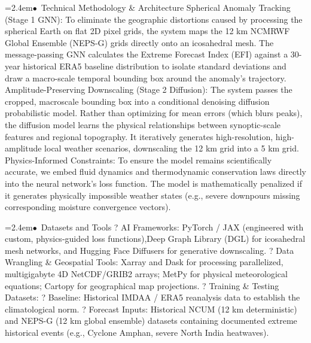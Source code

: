 \documentclass[10pt,a4paper]{article}
\begin{document}
\begin{tcolorbox}[pscard, title={"\textbf{SIH26078} \quad $\vert$ \quad AI-Driven Spatio-Temporal Tracking of Extreme Weather Anomalies in Medium-R...}]
\noindent\hspace*{1.2em}\hangindent=2.4em\textcolor{sihblue}{$\bullet$}~\small Technical Methodology \& Architecture Spherical Anomaly Tracking (Stage 1 GNN): To eliminate the geographic distortions caused by processing the spherical Earth on flat 2D pixel grids, the system maps the 12 km NCMRWF Global Ensemble (NEPS-G) grids directly onto an icosahedral mesh. The message-passing GNN calculates the Extreme Forecast Index (EFI) against a 30-year historical ERA5 baseline distribution to isolate standard deviations and draw a macro-scale temporal bounding box around the anomaly's trajectory. Amplitude-Preserving Downscaling (Stage 2 Diffusion): The system passes the cropped, macroscale bounding box into a conditional denoising diffusion probabilistic model. Rather than optimizing for mean errors (which blurs peaks), the diffusion model learns the physical relationships between synoptic-scale features and regional topography. It iteratively generates high-resolution, high-amplitude local weather scenarios, downscaling the 12 km grid into a 5 km grid. Physics-Informed Constraints: To ensure the model remains scientifically accurate, we embed fluid dynamics and thermodynamic conservation laws directly into the neural network's loss function. The model is mathematically penalized if it generates physically impossible weather states (e.g., severe downpours missing corresponding moisture convergence vectors).\par\vspace{0.05cm}
\noindent\hspace*{1.2em}\hangindent=2.4em\textcolor{sihblue}{$\bullet$}~\small Datasets and Tools ? AI Frameworks: PyTorch / JAX (engineered with custom, physics-guided loss functions),Deep Graph Library (DGL) for icosahedral mesh networks, and Hugging Face Diffusers for generative downscaling. ? Data Wrangling \& Geospatial Tools: Xarray and Dask for processing parallelized, multigigabyte 4D NetCDF/GRIB2 arrays; MetPy for physical meteorological equations; Cartopy for geographical map projections. ? Training \& Testing Datasets: ? Baseline: Historical IMDAA / ERA5 reanalysis data to establish the climatological norm. ? Forecast Inputs: Historical NCUM (12 km deterministic) and NEPS-G (12 km global ensemble) datasets containing documented extreme historical events (e.g., Cyclone Amphan, severe North India heatwaves).\par\vspace{0.05cm}

\end{tcolorbox}
\end{document}
